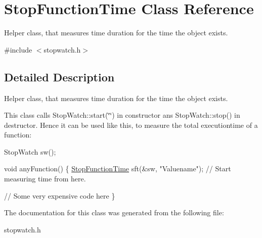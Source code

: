 \hypertarget{classStopFunctionTime}{\section{Stop\-Function\-Time Class Reference}
\label{classStopFunctionTime}
}


Helper class, that measures time duration for the time the object exists.  




{\ttfamily \#include $<$stopwatch.\-h$>$}



\subsection{Detailed Description}
Helper class, that measures time duration for the time the object exists. 

This class calls Stop\-Watch\-::start(\char`\"{}\char`\"{}) in constructor ans Stop\-Watch\-::stop() in destructor. Hence it can be used like this, to measure the total executiontime of a function\-:


\begin{DoxyCode}
StopWatch sw();

\textcolor{keywordtype}{void} anyFunction()
\{
   \hyperlink{classStopFunctionTime}{StopFunctionTime} sft(&sw, \textcolor{stringliteral}{"Valuename"}); \textcolor{comment}{// Start measuring time from here.}

   \textcolor{comment}{// Some very expensive code here}
\}
\end{DoxyCode}
 

The documentation for this class was generated from the following file\-:\begin{DoxyCompactItemize}
\item 
stopwatch.\-h\end{DoxyCompactItemize}
